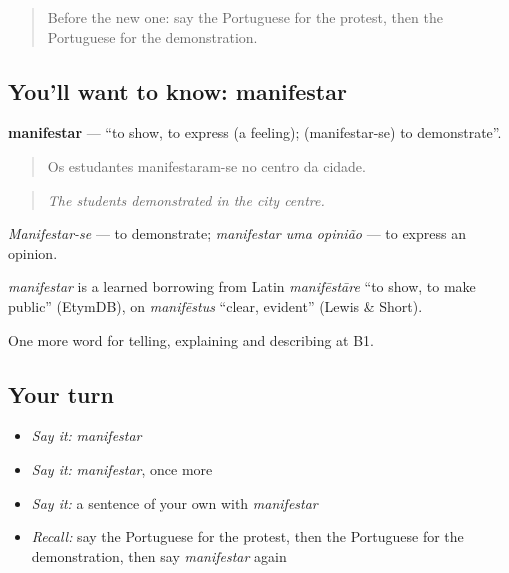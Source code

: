 \label{lesson:PT-C364-manifestar}



\begin{quote}
Before the new one: say the Portuguese for the protest, then the Portuguese for the demonstration.
\end{quote}

\subsection*{You'll want to know: manifestar}
\textbf{manifestar} — \textquotedblleft{}to show, to express (a feeling); (manifestar-se) to demonstrate\textquotedblright{}.

\begin{quote}
Os estudantes manifestaram-se no centro da cidade.
\end{quote}

\begin{quote}
\emph{The students demonstrated in the city centre.}
\end{quote}

\emph{Manifestar-se} — to demonstrate; \emph{manifestar uma opinião} — to express an opinion.

\begin{cousinweb}
\emph{manifestar} is a learned borrowing from Latin \emph{manifēstāre} \textquotedblleft{}to show, to make public\textquotedblright{} (EtymDB), on \emph{manifēstus} \textquotedblleft{}clear, evident\textquotedblright{} (Lewis \& Short).
\end{cousinweb}

\begin{grammarlens}[title={What you've built}]
One more word for telling, explaining and describing at B1.
\end{grammarlens}

\subsection*{Your turn}
\begin{itemize}
\raggedright
  \item \emph{Say it:} \emph{manifestar}
  \item \emph{Say it:} \emph{manifestar}, once more
  \item \emph{Say it:} a sentence of your own with \emph{manifestar}
  \item \emph{Recall:} say the Portuguese for the protest, then the Portuguese for the demonstration, then say \emph{manifestar} again
\end{itemize}

